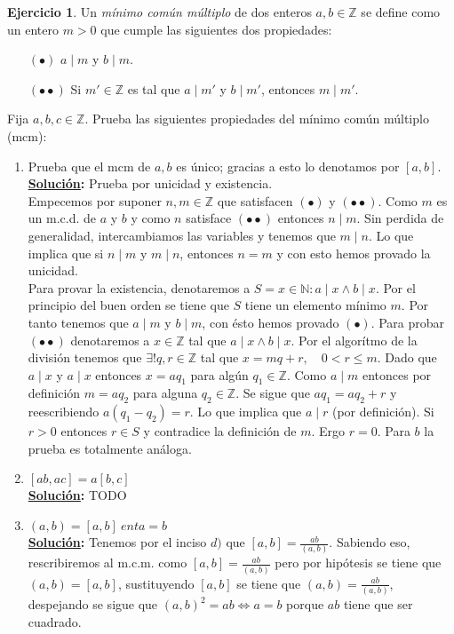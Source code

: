 \documentclass[11pt,letterpaper]{article}
\theoremstyle{definition}\newtheorem{p}{Ejercicio}
\theoremstyle{definition}\newtheorem{pp}[p]{$(*)$Ejercicio}
\numberwithin{p}{section}
\newcommand{\Z}{\mathbb{Z}}
\newcommand{\N}{\mathbb{N}}
\newcommand{\sol}{\textbf{\underline{Solución}: }} %
\begin{document}
\begin{p}
  Un \emph{m\'inimo com\'un m\'ultiplo} de dos enteros $a,b\in\Z$ se define como un entero $m> 0$
  que cumple las siguientes dos propiedades:
  \begin{enumerate}
  \item[$(\bullet)$] $a\mid m$ y $b\mid m$.
  \item[$(\bullet\bullet)$] Si $m'\in\Z$ es tal que $a\mid m'$ y $b\mid m'$, entonces $m\mid m'$.
  \end{enumerate}
  Fija $a,b,c\in\Z$. Prueba las siguientes propiedades del m\'inimo com\'un m\'ultiplo (mcm):
  \begin{enumerate}
  \item Prueba que el mcm de $a,b$ es \'unico; gracias a esto lo denotamos por $[a,b]$.\\
  \sol Prueba por unicidad y existencia.\\
  Empecemos por suponer $n,m \in \Z$ que satisfacen $(\bullet)$ y 
  $(\bullet \bullet)$. Como $m$ es un m.c.d. de $a$ y $b$ y como $n$ satisface $(\bullet \bullet)$ 
  entonces $n \mid m$. Sin perdida de generalidad, intercambiamos las variables y tenemos que
  $m \mid n$. Lo que implica que si $n \mid m$ y $m \mid n$, entonces $n=m$ y con esto 
  hemos provado la unicidad.\\
  Para provar la existencia, denotaremos a $S = {x \in \N : a \mid x \land b \mid x}$. Por el 
  principio del buen orden se tiene que $S$ tiene un elemento mínimo $m$. Por tanto tenemos que 
  $a \mid m$ y $b \mid m$, con ésto hemos provado $(\bullet)$. Para probar $(\bullet \bullet)$ 
  denotaremos a $x \in \Z$ tal que $a \mid x \land b \mid x$. Por el algorítmo de la división 
  tenemos que $\exists! q, r \in \Z$ tal que $x = mq+r, \quad 0 < r \leq m$. Dado que $a \mid x$
  y $a \mid x$ entonces $x = aq_1$ para algún $q_1 \in \Z$. Como $a \mid m$ entonces por definición 
  $m = aq_2$ para alguna $q_2 \in \Z$. Se sigue que $aq_1 = aq_2+r$ y reescribiendo $a(q_1 - q_2)= r$. 
  Lo que implica que $a \mid r$ (por definición). Si $r>0$ entonces $r \in S$ y contradice la 
  definición de $m$. Ergo $r = 0$. Para $b$ la prueba es totalmente análoga.
  
  \item $[ab,ac]=a[b,c]$\\
  \sol TODO
  
  \item $(a,b)=[a,b]\ ent a=b$\\
  \sol Tenemos por el inciso $d)$ que $[a,b]=\frac{ab}{(a,b)}$. Sabiendo eso, rescribiremos al m.c.m. como 
  $[a,b] = \frac{ab}{(a,b)}$ pero por hipótesis se tiene que $(a,b)=[a,b]$, sustituyendo $[a,b]$ se tiene que 
  $(a,b) = \frac{ab}{(a,b)}$, despejando se sigue que $(a,b)^2 = ab \iff a=b$ porque $ab$ tiene que 
  ser cuadrado.
  

\end{enumerate}
\end{p}
\end{document}
